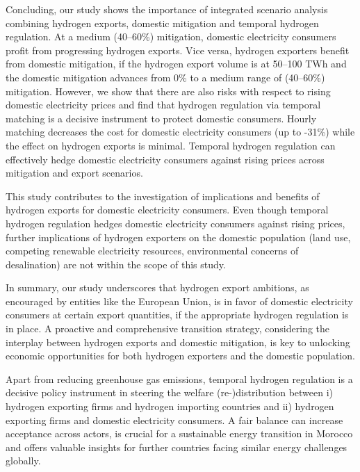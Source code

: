 

Concluding, our study shows the importance of integrated scenario analysis combining hydrogen exports, domestic \co mitigation and temporal hydrogen regulation.
At a medium (40--60\%) \co mitigation, domestic electricity consumers profit from progressing hydrogen exports. Vice versa, hydrogen exporters benefit from domestic \co mitigation, if the hydrogen export volume is at 50--100 TWh and the domestic \co mitigation advances from 0\% to a medium range of (40--60\%) \co mitigation. However, we show that there are also risks with respect to rising domestic electricity prices
and find that hydrogen regulation via temporal matching is a decisive instrument
to protect domestic consumers. Hourly matching decreases the cost for domestic electricity consumers (up to -31\%) while the effect on hydrogen exports is minimal. Temporal hydrogen regulation can effectively hedge domestic electricity consumers against rising prices across mitigation and export scenarios.

This study contributes to the investigation of implications and benefits of hydrogen exports for domestic electricity consumers. Even though temporal hydrogen regulation hedges domestic electricity consumers against rising prices, further implications of hydrogen exporters on the domestic population (land use, competing renewable electricity resources, environmental concerns of desalination) are not within the scope of this study.

In summary, our study underscores that hydrogen export ambitions, as encouraged by entities like the European Union, is in favor of domestic electricity consumers at certain export quantities, if the appropriate hydrogen regulation is in place. A proactive and comprehensive transition strategy, considering the interplay between hydrogen exports and domestic \co mitigation, is key to unlocking economic opportunities for both hydrogen exporters and the domestic population. 


Apart from reducing greenhouse gas emissions, temporal hydrogen regulation is a decisive policy instrument in steering the welfare (re-)distribution between i) hydrogen exporting firms and hydrogen importing countries and ii) hydrogen exporting firms and domestic electricity consumers. 
A fair balance can increase acceptance across actors, is crucial for a sustainable energy transition in Morocco and offers valuable insights for further countries facing similar energy challenges globally.
